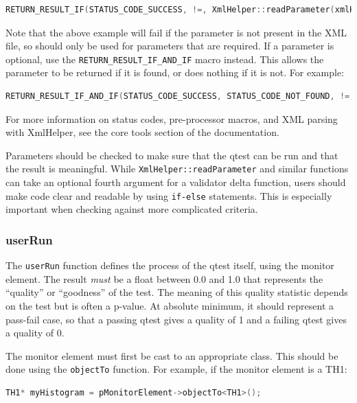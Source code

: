 \begin{lstlisting}[language=C++]
RETURN_RESULT_IF(STATUS_CODE_SUCCESS, !=, XmlHelper::readParameter(xmlHandle, "PropertyName", m_property))
\end{lstlisting}

Note that the above example will fail if the parameter is not present in the XML file, so should only be used for parameters that are required. If a parameter is optional, use the \texttt{RETURN\_RESULT\_IF\_AND\_IF} macro instead. This allows the parameter to be returned if it is found, or does nothing if it is not. For example:

\begin{lstlisting}[language=C++]
    RETURN_RESULT_IF_AND_IF(STATUS_CODE_SUCCESS, STATUS_CODE_NOT_FOUND, !=, XmlHelper::readParameter(xmlHandle, "PropertyName", m_property))
\end{lstlisting}

For more information on status codes, pre-processor macros, and \acrshort{XML} parsing with XmlHelper, see the core tools section of the documentation.

Parameters should be checked to make sure that the \acrshort{qtest} can be run and that the result is meaningful. While \texttt{XmlHelper::readParameter} and similar functions can take an optional fourth argument for a validator delta function, users should make code clear and readable by using \texttt{if-else} statements. This is especially important when checking against more complicated criteria.

\subsubsection{userRun}
The \texttt{userRun} function defines the process of the \acrshort{qtest} itself, using the monitor element. The result \textit{must} be a float between 0.0 and 1.0 that represents the ``quality'' or ``goodness'' of the test. The meaning of this quality statistic depends on the test but is often a p-value. At absolute minimum, it should represent a pass-fail case, so that a passing \acrshort{qtest} gives a quality of 1 and a failing \acrshort{qtest} gives a quality of 0.

The monitor element must first be cast to an appropriate class. This should be done using the \texttt{objectTo} function. For example, if the monitor element is a TH1:

\begin{lstlisting}[language=C++]
TH1* myHistogram = pMonitorElement->objectTo<TH1>();
\end{lstlisting}

